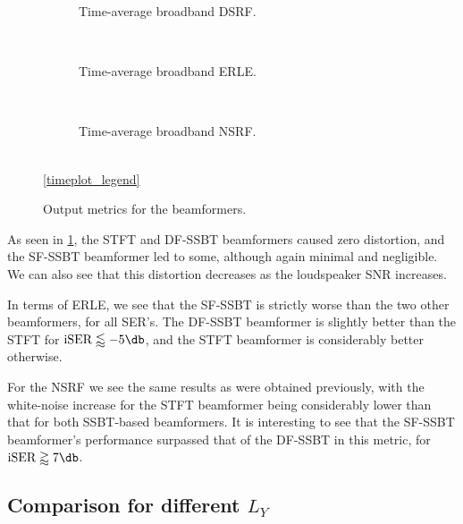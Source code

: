 
\begin{figure}[!t]
	\centering
	\begin{subfigure}{\textwidth}
		\centering
		
		\caption{Time-average broadband DSRF.}
		\label{subfig:lineplot__v7__DSRF__iSER_var__Ly_1__err_0}
	\end{subfigure}\\[1em]
	\begin{subfigure}{\textwidth}
		\centering
		
		\caption{Time-average broadband ERLE.}
		\label{subfig:lineplot__v7__ERLE__iSER_var__Ly_1__err_0}
	\end{subfigure}\\[1em]
	\begin{subfigure}{\textwidth}
		\centering
		
		\caption{Time-average broadband NSRF.}
		\label{subfig:lineplot__v7__NSRF__iSER_var__Ly_1__err_0}
	\end{subfigure}\\[1em]
	\ref*{timeplot_legend}
	\caption{Output metrics for the beamformers.}
	\label{fig:lineplot__v7__iSER_var__Ly_1__err_0}
\end{figure}

As seen in \cref{subfig:lineplot__v7__DSRF__iSER_var__Ly_1__err_0}, the STFT and DF-SSBT beamformers caused zero distortion, and the SF-SSBT beamformer led to some, although again minimal and negligible. We can also see that this distortion decreases as the loudspeaker SNR increases.

In terms of ERLE, we see that the SF-SSBT is strictly worse than the two other beamformers, for all SER's. The DF-SSBT beamformer is slightly better than the STFT for $\iser \lessapprox -5\dB$, and the STFT beamformer is considerably better otherwise.

For the NSRF we see the same results as were obtained previously, with the white-noise increase for the STFT beamformer being considerably lower than that for both SSBT-based beamformers. It is interesting to see that the SF-SSBT beamformer's performance surpassed that of the DF-SSBT in this metric, for $\iser \gtrapprox 7\dB$.

\subsection{Comparison for different $L_Y$}

